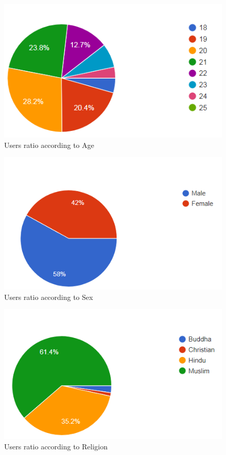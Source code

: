 \documentclass{standalone}
\begin{document}
\begin{figure}[h]
				\centering
				\includegraphics[scale=0.8]{./img/age}
				\caption{Users ratio according to Age} \label{fig:mapComp}
\end{figure}
\begin{figure}[h]
				\centering
				\includegraphics[scale=0.8]{./img/sex}
				\caption{Users ratio according to Sex} \label{fig:mapComp}
\end{figure}
\begin{figure}[h]
				\centering
				\includegraphics[scale=0.8]{./img/religion}
				\caption{Users ratio according to Religion} \label{fig:mapComp}
\end{figure}
\end{document}
